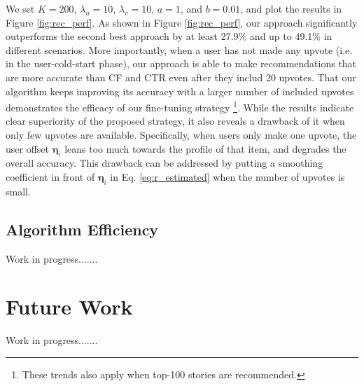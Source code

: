 \documentclass[conference]{IEEEtran}
\begin{document}
We set $K=200$, $\lambda_u=10$, $\lambda_v=10$, $a=1$, and $b=0.01$, and plot the results in Figure \ref{fig:rec_perf}. As shown in Figure \ref{fig:rec_perf}, our approach significantly outperforms the second best approach by at least 27.9\% and up to 49.1\%  in different scenarios. More importantly, when a user has not made any upvote (i.e. in the user-cold-start phase), our approach is able to make recommendations that are more accurate than CF and CTR even after they includ 20 upvotes. That our algorithm keeps improving its accuracy with a larger number of included upvotes demonstrates the efficacy of our fine-tuning strategy \footnote{These trends also apply when top-100 stories are recommended.}. While the results indicate clear superiority of the proposed strategy, it also reveals a drawback of it when only few upvotes are available. Specifically, when users only make one upvote, the user offset $\mathbf{\eta}_i$ leans too much towards the profile of that item, and degrades the overall accuracy. This drawback can be addressed by putting a smoothing coefficient in front of $\mathbf{\eta}_i$ in Eq. \ref{eq:r_estimated} when the number of upvotes is small.


\subsection{Algorithm Efficiency}
Work in progress.......




\section{Future Work}

Work in progress.......

%
%
\end{document}
